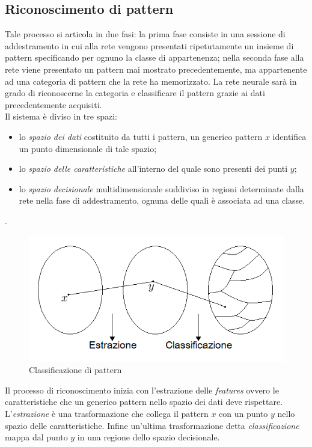 \documentclass[12pt,a4paper,oneside]{book}
\begin{document}
		\subsection{Riconoscimento di pattern}
		
		Tale processo si articola in due fasi: la prima fase consiste in una sessione di addestramento in cui  alla rete vengono presentati ripetutamente un insieme di pattern specificando per ognuno la classe di appartenenza; nella seconda fase alla rete viene presentato un pattern mai mostrato precedentemente, ma appartenente ad una categoria di pattern che la rete ha memorizzato. La rete neurale sarà in grado di riconoscerne la categoria e classificare il pattern grazie ai dati precedentemente acquisiti.\\
		Il sistema è diviso in tre spazi:\\
		
		\begin{itemize}
		\item lo \emph{spazio dei dati} costituito da tutti i pattern, un generico pattern $x$ identifica un punto dimensionale di tale spazio;
		\item lo \emph{spazio delle caratteristiche} all'interno del quale sono presenti dei punti $y$;
		\item lo \emph{spazio decisionale} multidimensionale suddiviso in regioni determinate dalla rete nella fase di addestramento, ognuna delle quali è associata ad una classe.
		\end{itemize}.
		
		\begin{figure}[h]
			\centering
			\includegraphics[width=0.8\linewidth]{IMMAGINI/classificazione}
			\caption{ Classificazione di pattern }
			\label{fig:classificazione}
		\end{figure}
		
		Il processo di riconoscimento inizia con l'estrazione delle \emph{features} ovvero le caratteristiche che un generico pattern nello spazio dei dati deve rispettare. L'\emph{estrazione} è una trasformazione che collega il pattern $x$ con un punto $y$ nello spazio delle caratteristiche. Infine un'ultima trasformazione detta \emph{classificazione} mappa dal punto $y$ in una regione dello spazio decisionale.\\
		
\end{document}
